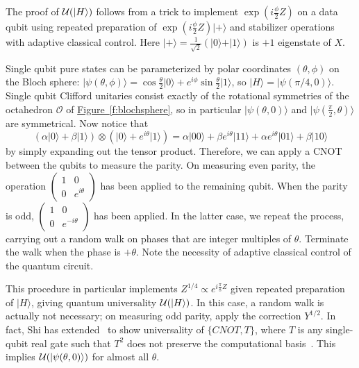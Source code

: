 \documentclass[11pt]{article}
\def\ket #1{\vert #1\rangle}
\theoremstyle{note}
\newcommand{\figref}[1]{\hyperref[#1]{{Figure~\ref*{#1}}}}
\begin{document}
The proof of $\magic{\ket H}$ follows from a trick to implement $\exp(i \tfrac{\phi}{2} Z)$ on a data qubit using repeated preparation of $\exp(i \tfrac{\phi}{2} Z) \ket{+}$ and stabilizer operations with adaptive classical control.  Here $\ket{+} = \tfrac{1}{\sqrt{2}}(\ket{0}+\ket{1})$ is $+1$ eigenstate of $X$.

Single qubit pure states can be parameterized by polar coordinates $(\theta, \phi)$ on the Bloch sphere: $\ket{\psi(\theta,\phi)} = \cos \tfrac{\theta}{2} \ket{0} + e^{i \phi} \sin \tfrac{\theta}{2} \ket{1}$, so $\ket H = \ket{\psi(\pi/4, 0)}$.  Single qubit Clifford unitaries consist exactly of the rotational symmetries of the octahedron $\mathcal{O}$ of \figref{f:blochsphere}, so in particular $\ket{\psi(\theta,0)}$ and $\ket{\psi(\tfrac{\pi}{2},\theta)}$ are symmetrical.  Now notice that 
\begin{equation}
(\alpha \ket{0} + \beta \ket{1}) \otimes (\ket{0} + e^{i \theta} \ket{1}) = \alpha \ket{00} + \beta e^{i \theta} \ket{11} + \alpha e^{i \theta} \ket{01} + \beta \ket{10}
\end{equation}
by simply expanding out the tensor product.  Therefore, we can apply a CNOT between the qubits to measure the parity.  On measuring even parity, the operation $\left(\begin{smallmatrix}1&0\\0&e^{i \theta}\end{smallmatrix}\right)$ has been applied to the remaining qubit.  When the parity is odd, $\left(\begin{smallmatrix}1&0\\0&e^{-i \theta}\end{smallmatrix}\right)$ has been applied.  In the latter case, we repeat the process, carrying out a random walk on phases that are integer multiples of $\theta$.  Terminate the walk when the phase is $+\theta$.  Note the necessity of adaptive classical control of the quantum circuit.

This procedure in particular implements $Z^{1/4} \propto e^{i \tfrac{\pi}{8} Z}$ given repeated preparation of $\ket H$, giving quantum universality $\magic{\ket H}$.  In this case, a random walk is actually not necessary; on measuring odd parity, apply the correction $Y^{1/2}$.  In fact, Shi has extended~\cite{BarencoBennettCleveDiVincenzoMargolusShorSleatorSmolinWeinfurter95} to show universality of $\{CNOT, T\}$, where $T$ is any single-qubit real gate such that $T^2$ does not preserve the computational basis~\cite{Shi02}.  This implies $\magic{\ket{\psi(\theta,0)}}$ for almost all $\theta$.
\end{document}
